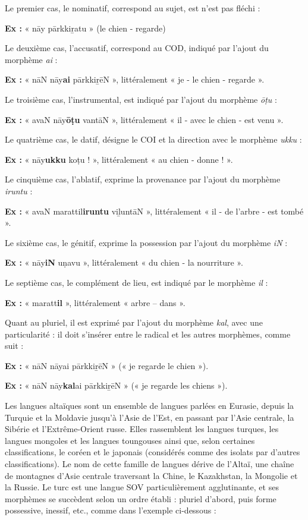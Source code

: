 Le premier cas, le nominatif, correspond au sujet, est n’est pas fléchi :

\noindent\textbf{Ex :} « nāy pārkki{\BBFifthTranslit ṟ}atu » (le chien - regarde)

Le deuxième cas, l’accusatif, correspond au COD, indiqué par l’ajout du morphème \textit{ai} :

\noindent\textbf{Ex :} « nāN nāy\textbf{ai} pārkki{\BBFifthTranslit ṟ}ēN », littéralement « je - le chien - regarde ».

Le troisième cas, l’instrumental, est indiqué par l’ajout du morphème \textit{ōṭu} :

\noindent\textbf{Ex :} « avaN nāy\textbf{ōṭu} vantāN », littéralement « il - avec le chien - est venu ».

Le quatrième cas, le datif, désigne le COI et la direction avec le morphème \textit{ukku} :

\noindent\textbf{Ex :} « nāy\textbf{ukku} koṭu ! », littéralement « au chien - donne ! ».

Le cinquième cas, l’ablatif, exprime la provenance par l’ajout du morphème \textit{iruntu} :

\noindent\textbf{Ex :} « avaN marattil\textbf{iruntu} vi{\BBFifthTranslit ḻ}untāN », littéralement « il - de l’arbre - est tombé ».

Le sixième cas, le génitif, exprime la possession par l’ajout du morphème \textit{iN} :

\noindent\textbf{Ex :} « nāy\textbf{iN} uṇavu », littéralement « du chien - la nourriture ».

Le septième cas, le complément de lieu, est indiqué par le morphème \textit{il} :

\noindent\textbf{Ex :} « maratt\textbf{il} », littéralement « arbre – dans ».

Quant au pluriel, il est exprimé par l’ajout du morphème \textit{kal}, avec une particularité : il doit s’insérer entre le radical et les autres morphèmes, comme suit :

\noindent\textbf{Ex :} « nāN nāyai pārkki{\BBFifthTranslit ṟ}ēN » (« je regarde le chien »).

\noindent\textbf{Ex :} « nāN nāy\textbf{kal}ai pārkki{\BBFifthTranslit ṟ}ēN » (« je regarde les chiens »).

Les langues altaïques sont un ensemble de langues parlées en Eurasie, depuis la Turquie et la Moldavie jusqu’à l’Asie de l’Est, en passant par l’Asie centrale, la Sibérie et l’Extrême-Orient russe. Elles rassemblent les langues turques, les langues mongoles et les langues toungouses ainsi que, selon certaines classifications, le coréen et le japonais (considérés comme des isolats par d’autres classifications). Le nom de cette famille de langues dérive de l’Altaï, une chaîne de montagnes d’Asie centrale traversant la Chine, le Kazakhstan, la Mongolie et la Russie. Le turc est une langue SOV particulièrement agglutinante, et ses morphèmes se succèdent selon un ordre établi : pluriel d’abord, puis forme possessive, inessif, etc., comme dans l’exemple ci-dessous :

